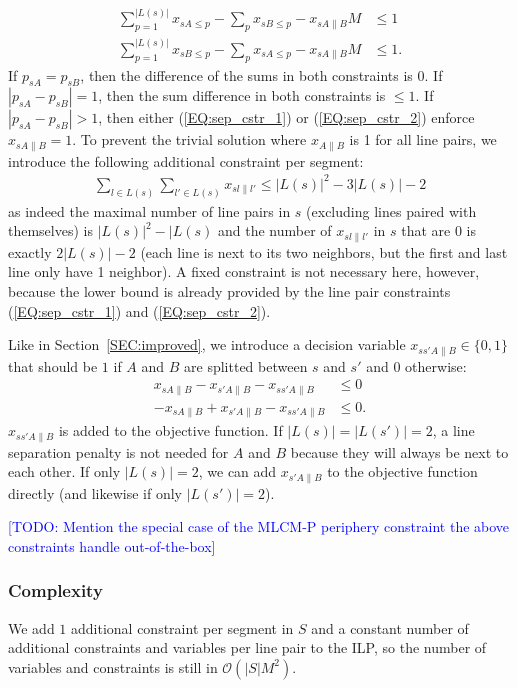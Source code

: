 \documentclass{llncs}
\newcommand\todo[1]{\textcolor{blue}{[TODO: #1]}}
\begin{document}
\begin{align}
	\sum_{p=1}^{|L(s)|} x_{sA\leq p} - \sum_{p} x_{sB\leq p} - x_{sA\|B} M &\leq 1 \label{EQ:sep_cstr_1} \\
	\sum_{p=1}^{|L(s)|} x_{sB\leq p} - \sum_{p} x_{sA\leq p} - x_{sA\|B} M &\leq 1. \label{EQ:sep_cstr_2}
\end{align}
If $p_{sA} = p_{sB}$, then the difference of the sums in both constraints is 0. If $|p_{sA} - p_{sB}| = 1$, then the sum difference in both constraints is $\leq 1$. If $|p_{sA} - p_{sB}| > 1$, then either (\ref{EQ:sep_cstr_1}) or (\ref{EQ:sep_cstr_2}) enforce $x_{sA\|B} = 1$. To prevent the trivial solution where $x_{A\|B}$ is 1 for all line pairs, we introduce the following additional constraint per segment:
\begin{align}
	\sum_{l \in L(s)}\sum_{l' \in L(s)} x_{sl\|l'} \leq |L(s)|^2 - 3|L(s)| - 2
\end{align}
as indeed the maximal number of line pairs in $s$ (excluding lines paired with themselves) is $|L(s)|^2 - |L(s)$ and the number of $x_{sl\|l'}$ in $s$ that are 0 is exactly $2|L(s)| - 2$ (each line is next to its two neighbors, but the first and last line only have 1 neighbor). A fixed constraint is not necessary here, however, because the lower bound is already provided by the line pair constraints (\ref{EQ:sep_cstr_1}) and (\ref{EQ:sep_cstr_2}).

Like in Section~\ref{SEC:improved}, we introduce a decision variable $x_{ss'A\|B} \in \{0, 1\}$ that should be $1$ if $A$ and $B$ are splitted between $s$ and $s'$ and $0$ otherwise:
\begin{align}
	x_{sA\|B} - x_{s'A\|B} - x_{ss'A\|B} &\leq 0 \\
	-x_{sA\|B} + x_{s'A\|B} - x_{ss'A\|B} &\leq 0.
\end{align}
$x_{ss'A\|B}$ is added to the objective function. If $|L(s)| = |L(s')| = 2$, a line separation penalty is not needed for $A$ and $B$ because they will always be next to each other. If only $|L(s)| = 2$, we can add $x_{s'A\|B}$ to the objective function directly (and likewise if only $|L(s')|=2$).

\todo{Mention the special case of the MLCM-P periphery constraint the above constraints handle out-of-the-box}

\subsubsection{Complexity}
We add $1$ additional constraint per segment in $S$ and a constant number of additional constraints and variables per line pair to the ILP, so the number of variables and constraints is still in $\mathcal{O}(|S|M^2)$.
\end{document}
